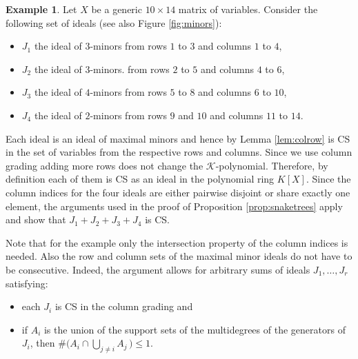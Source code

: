 \documentclass{amsart}
\theoremstyle{definition}
\newtheorem{example}[theorem]{Example}
\numberwithin{equation}{section}
\def\cK{\mathcal{K}}
\begin{document}
\begin{example}

Let $X$ be a generic $10 \times 14$ matrix of variables. 
Consider the following set of ideals (see also Figure \ref{fig:minors}):
\begin{itemize}
    \item $J_1$ the ideal of $3$-minors from 
rows $1$ to $3$ and columns $1$ to $4$, 
    \item $J_2$ the ideal of $3$-minors. 
    from rows $2$ to $5$ and columns $4$ to $6$,
    \item $J_3$ the ideal of $4$-minors from 
    rows $5$ to $8$ and columns $6$ to $10$,
    \item $J_4$ the ideal of $2$-minors from 
    rows $9$ and $10$ and columns $11$ to $14$.
    \end{itemize}
    Each ideal is an ideal of maximal minors and 
    hence by Lemma \ref{lem:colrow} is CS in the set of
    variables from the respective rows and columns. 
    Since we use column grading adding more rows does
    not change the $\cK$-polynomial. 
    Therefore, by definition each of them is CS as an ideal in  the polynomial ring $K[X]$. 
    Since the column indices for the four ideals are either pairwise disjoint or  share exactly one element, the
    arguments used in the proof of Proposition \ref{prop:snaketrees} apply and show that 
    $J_1 + J_2 + J_3 + J_4$
    is CS.

Note that for the example only the intersection property of the column indices is needed. Also the row and column sets 
of the maximal minor ideals do not have to be consecutive. Indeed, the argument allows for arbitrary sums of ideals 
$J_1,\ldots, J_r$ satisfying:   
\begin{itemize}
    \item each $J_i$ is CS in the column grading  and 
    \item  
    if $A_i$ is the union of the support sets of the 
    multidegrees of the
    generators of $J_i$, then 
    $\#\big( A_i \cap \bigcup_{j \neq i} A_j \,\big) \leq 1$.
    \end{itemize}
   

\begin{figure}[ht!]
\end{figure}
\end{example}
\end{document}
